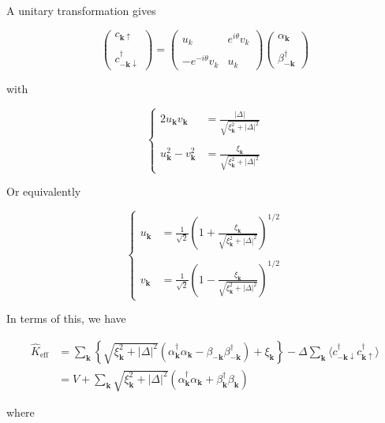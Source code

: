A unitary transformation gives

\[
\left(\begin{matrix}
c_{\bm{k}\uparrow}\\
\ \\
c_{-\bm{k}\downarrow}^\dagger
\end{matrix}\right) 
= \left(\begin{matrix}
u_k & e^{i\theta}v_k\\
\ & \ \\
-e^{-i\theta}v_k & u_k
\end{matrix}\right) \left(\begin{matrix}
\alpha_{\bm{k}}\\
\ \\
\beta_{-\bm{k}}^\dagger
\end{matrix}\right)  \]

with

\[
\begin{cases}
2u_{\bm{k}}v_{\bm{k}} &= \displaystyle\frac{|\Delta|}{\sqrt{\xi_{\bm{k}}^2+|\Delta|^2}}\\
\ & \ \\
u_{\bm{k}}^2-v_{\bm{k}}^2 &= \displaystyle\frac{\xi_{\bm{k}}}{\sqrt{\xi_{\bm{k}}^2+|\Delta|^2}}
\end{cases}\]

Or equivalently

\[
\begin{cases}
u_{\bm{k}} &= \displaystyle\frac{1}{\sqrt{2}}\left(1+\frac{\xi_{\bm{k}}}{\sqrt{\xi_{\bm{k}}^2+|\Delta|^2}}\right)^{1/2}\\
\ & \ \\
v_{\bm{k}} &= \displaystyle\frac{1}{\sqrt{2}}\left(1-\frac{\xi_{\bm{k}}}{\sqrt{\xi_{\bm{k}}^2+|\Delta|^2}}\right)^{1/2}
\end{cases}
\]

In terms of this, we have

\[\begin{split}
\hat{K}_{\text{eff}}&=\sum_{\bm{k}}\left\{\sqrt{\xi_{\bm{k}}^2+|\Delta|^2}(\alpha_{\bm{k}}^\dagger\alpha_{\bm{k}}-\beta_{-\bm{k}}\beta_{-\bm{k}}^\dagger)+\xi_{\bm{k}}\right\}- \Delta\sum_{\bm{k}}\langle c_{-\bm{k}\downarrow}^\dagger c_{\bm{k}\uparrow}^\dagger\rangle\\
&= V+\sum_{\bm{k}}\sqrt{\xi_{\bm{k}}^2+|\Delta|^2}(\alpha_{\bm{k}}^\dagger\alpha_{\bm{k}}+\beta_{\bm{k}}^\dagger\beta_{\bm{k}})
\end{split}\]

where


